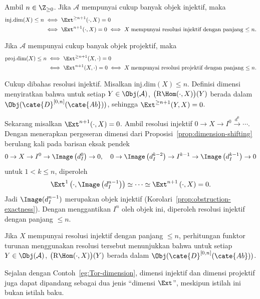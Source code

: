\begin{proposisi}\label{prop:id-pd-Ext}
	Ambil $n\in\Z_{\geq0}$. Jika $\mathcal{A}$ mempunyai cukup banyak objek
	injektif, maka
	\begin{align*}
		\mathrm{inj.dim}(X) \leq n & \iff \Ext^{\geq n+1}(\cdot, X) = 0 \\
		& \iff \Ext^{n+1}(\cdot, X) = 0 \iff X\;\text{mempunyai resolusi injektif dengan panjang $\leq n$}.
	\end{align*}

	Jika $\mathcal{A}$ mempunyai cukup banyak objek projektif, maka
	\begin{align*}
		\mathrm{proj.dim}(X) \leq n & \iff \Ext^{\geq n+1}(X, \cdot) = 0 \\
		& \iff \Ext^{n+1}(X, \cdot) = 0 \iff X\;\text{mempunyai resolusi projektif dengan panjang $\leq n$}.
	\end{align*}
\end{proposisi}
\begin{bukti}
	Cukup dibahas resolusi injektif. Misalkan $\mathrm{inj.dim}(X)\leq n$.
	Definisi dimensi menyiratkan bahwa untuk setiap $Y\in\Obj(\mathcal{A})$,
	$\bigl(\mathrm{R}\Hom(\cdot,X)\bigr)(Y)$ berada dalam
	$\Obj(\cate{D}^{[0,n]}(\cate{Ab}))$, sehingga
	$\Ext^{\geq n+1}(Y,X)=0$.

	Sekarang misalkan $\Ext^{n+1}(\cdot,X)=0$. Ambil resolusi injektif
	$0\to X\to I^0\xrightarrow{d^0}\cdots$. Dengan menerapkan pergeseran
	dimensi dari Proposisi~\ref{prop:dimension-shifting} berulang kali pada
	barisan eksak pendek
	\[ 0 \to X \to I^0 \to \Image\left(d_I^0 \right) \to 0, \quad 0 \to \Image\left( d_I^{k-2}\right) \to I^{k-1} \to \Image\left(d_I^{k-1} \right) \to 0 \]
	untuk $1<k\leq n$, diperoleh
	\[ \Ext^1\left(\cdot, \Image\left(d_I^{n-1}\right) \right) \simeq \cdots \simeq \Ext^{n+1}\left(\cdot, X \right) = 0. \]
	Jadi $\Image(d_I^{n-1})$ merupakan objek injektif
	(Korolari~\ref{prop:obstruction-exactness}). Dengan menggantikan $I^n$ oleh
	objek ini, diperoleh resolusi injektif dengan panjang $\leq n$.

	Jika $X$ mempunyai resolusi injektif dengan panjang $\leq n$, perhitungan
	funktor turunan menggunakan resolusi tersebut menunjukkan bahwa untuk setiap
	$Y\in\Obj(\mathcal{A})$,
	$\bigl(\mathrm{R}\Hom(\cdot,X)\bigr)(Y)$ berada dalam
	$\Obj(\cate{D}^{[0,n]}(\cate{Ab}))$.
\end{bukti}

Sejalan dengan Contoh~\ref{eg:Tor-dimension}, dimensi injektif dan dimensi
projektif juga dapat dipandang sebagai dua jenis ``dimensi $\Ext$'', meskipun
istilah ini bukan istilah baku.


